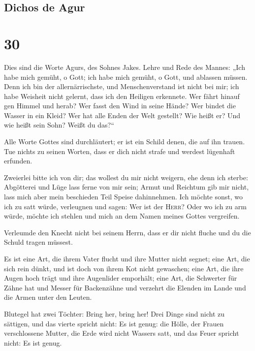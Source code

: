 \hypertarget{dichos-de-agur}{%
\subsection{Dichos de Agur}\label{dichos-de-agur}}

\hypertarget{section-29}{%
\section{30}\label{section-29}}

 Dies sind die Worte Agurs, des Sohnes Jakes. Lehre und
Rede des Mannes: „Ich habe mich gemüht, o Gott; ich habe mich gemüht, o
Gott, und ablassen müssen.  Denn ich bin der
allernärrischste, und Menschenverstand ist nicht bei mir; 
ich habe Weisheit nicht gelernt, dass ich den Heiligen erkennete.
 Wer fährt hinauf gen Himmel und herab? Wer fasst den Wind
in seine Hände? Wer bindet die Wasser in ein Kleid? Wer hat alle Enden
der Welt gestellt? Wie heißt er? Und wie heißt sein Sohn? Weißt du
das?{}``

 Alle Worte Gottes sind durchläutert; er ist ein Schild
denen, die auf ihn trauen.  Tue nichts zu seinen Worten,
dass er dich nicht strafe und werdest lügenhaft erfunden.

 Zweierlei bitte ich von dir; das wollest du mir nicht
weigern, ehe denn ich sterbe:  Abgötterei und Lüge lass
ferne von mir sein; Armut und Reichtum gib mir nicht, lass mich aber
mein beschieden Teil Speise dahinnehmen.  Ich möchte
sonst, wo ich zu satt würde, verleugnen und sagen: Wer ist der
\textsc{Herr}? Oder wo ich zu arm würde, möchte ich stehlen und mich an
dem Namen meines Gottes vergreifen.

 Verleumde den Knecht nicht bei seinem Herrn, dass er dir
nicht fluche und du die Schuld tragen müssest.

 Es ist eine Art, die ihrem Vater flucht und ihre Mutter
nicht segnet;  eine Art, die sich rein dünkt, und ist
doch von ihrem Kot nicht gewaschen;  eine Art, die ihre
Augen hoch trägt und ihre Augenlider emporhält;  eine
Art, die Schwerter für Zähne hat und Messer für Backenzähne und verzehrt
die Elenden im Lande und die Armen unter den Leuten.

 Blutegel hat zwei Töchter: Bring her, bring her! Drei
Dinge sind nicht zu sättigen, und das vierte spricht nicht: Es ist
genug:  die Hölle, der Frauen verschlossene Mutter, die
Erde wird nicht Wassers satt, und das Feuer spricht nicht: Es ist genug.

